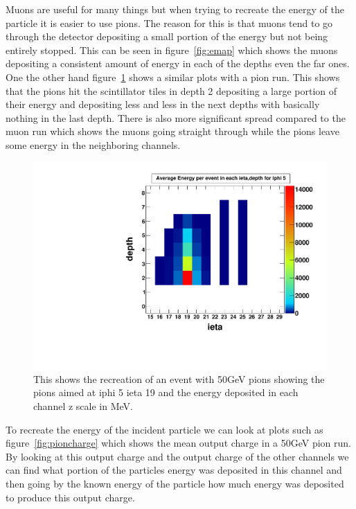 Muons are useful for many things but when trying to recreate the energy of the particle it is easier to use pions. The reason for this is that muons tend to go through the detector depositing a small portion of the energy but not being entirely stopped. This can be seen in figure~\ref{fig:emap} which shows the muons depositing a consistent amount of energy in each of the depths even the far ones. One the other hand figure~\ref{fig:pionmap} shows a similar plots with a pion run. This shows that the pions hit the scintillator tiles in depth 2 depositing a large portion of their energy and depositing less and less in the next depths with basically nothing in the last depth. There is also more significant spread compared to the muon run which shows the muons going straight through while the pions leave some energy in the neighboring channels.

\begin{figure}
\centering
\includegraphics[width=0.7\linewidth]{Figures/pionrun.pdf}
\caption{This shows the recreation of an event with 50GeV pions showing the pions aimed at iphi 5 ieta 19 and the energy deposited in each channel z scale in MeV.}
\label{fig:pionmap}
\end{figure}

To recreate the energy of the incident particle we can look at plots such as figure~\ref{fig:pioncharge} which shows the mean output charge in a 50GeV pion run. By looking at this output charge and the output charge of the other channels we can find what portion of the particles energy was deposited in this channel and then going by the known energy of the particle how much energy was deposited to produce this output charge. 

